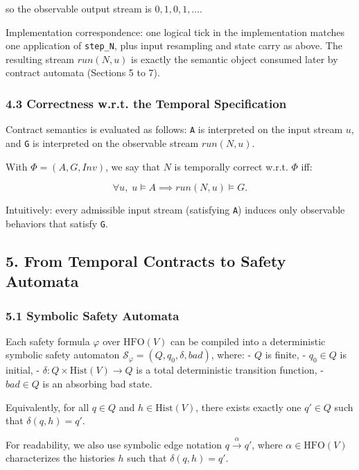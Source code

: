 \documentclass[
]{article}
\begin{document}
so the observable output stream is \(0,1,0,1,\dots\).

Implementation correspondence: one logical tick in the implementation
matches one application of \texttt{step\_N}, plus input resampling and
state carry as above. The resulting stream \(run(N,u)\) is exactly the
semantic object consumed later by contract automata (Sections 5 to 7).

\subsubsection{4.3 Correctness w.r.t. the Temporal
Specification}\label{correctness-w.r.t.-the-temporal-specification}

Contract semantics is evaluated as follows: \texttt{A} is interpreted on
the input stream \(u\), and \texttt{G} is interpreted on the observable
stream \(run(N,u)\).

With \(\Phi=(A,G,Inv)\), we say that \(N\) is temporally correct w.r.t.
\(\Phi\) iff:

\[
\forall u,\;
u \models A
\implies
run(N,u) \models G.
\]

Intuitively: every admissible input stream (satisfying \texttt{A})
induces only observable behaviors that satisfy \texttt{G}.

\subsection{5. From Temporal Contracts to Safety
Automata}\label{from-temporal-contracts-to-safety-automata}

\subsubsection{5.1 Symbolic Safety
Automata}\label{symbolic-safety-automata}

Each safety formula \(\varphi\) over \(\mathrm{HFO}(V)\) can be compiled
into a deterministic symbolic safety automaton
\(\mathcal S_\varphi=(Q,q_0,\delta,bad)\), where: - \(Q\) is finite, -
\(q_0\in Q\) is initial, - \(\delta: Q \times \mathrm{Hist}(V) \to Q\)
is a total deterministic transition function, - \(bad\in Q\) is an
absorbing bad state.

Equivalently, for all \(q\in Q\) and \(h\in\mathrm{Hist}(V)\), there
exists exactly one \(q'\in Q\) such that \(\delta(q,h)=q'\).

For readability, we also use symbolic edge notation
\(q \xrightarrow{\alpha} q'\), where \(\alpha\in\mathrm{HFO}(V)\)
characterizes the histories \(h\) such that \(\delta(q,h)=q'\).
\end{document}
